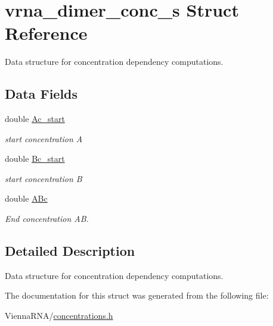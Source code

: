 \hypertarget{structvrna__dimer__conc__s}{}\section{vrna\+\_\+dimer\+\_\+conc\+\_\+s Struct Reference}
\label{structvrna__dimer__conc__s}


Data structure for concentration dependency computations.  


\subsection*{Data Fields}
\begin{DoxyCompactItemize}
\item 
\mbox{\label{structvrna__dimer__conc__s_a6e64ce1afbc93756afef06c0e3ccce97}} 
double \mbox{\hyperlink{structvrna__dimer__conc__s_a6e64ce1afbc93756afef06c0e3ccce97}{Ac\+\_\+start}}
\begin{DoxyCompactList}\small\item\em start concentration A \end{DoxyCompactList}\item 
\mbox{\label{structvrna__dimer__conc__s_a5763381efee22a0bbec2f2d0754f7697}} 
double \mbox{\hyperlink{structvrna__dimer__conc__s_a5763381efee22a0bbec2f2d0754f7697}{Bc\+\_\+start}}
\begin{DoxyCompactList}\small\item\em start concentration B \end{DoxyCompactList}\item 
\mbox{\label{structvrna__dimer__conc__s_aef56a1fe8d7f07e7b5d9a65417dda8a4}} 
double \mbox{\hyperlink{structvrna__dimer__conc__s_aef56a1fe8d7f07e7b5d9a65417dda8a4}{A\+Bc}}
\begin{DoxyCompactList}\small\item\em End concentration AB. \end{DoxyCompactList}\end{DoxyCompactItemize}


\subsection{Detailed Description}
Data structure for concentration dependency computations. 

The documentation for this struct was generated from the following file\+:\begin{DoxyCompactItemize}
\item 
Vienna\+R\+N\+A/\mbox{\hyperlink{concentrations_8h}{concentrations.\+h}}\end{DoxyCompactItemize}
